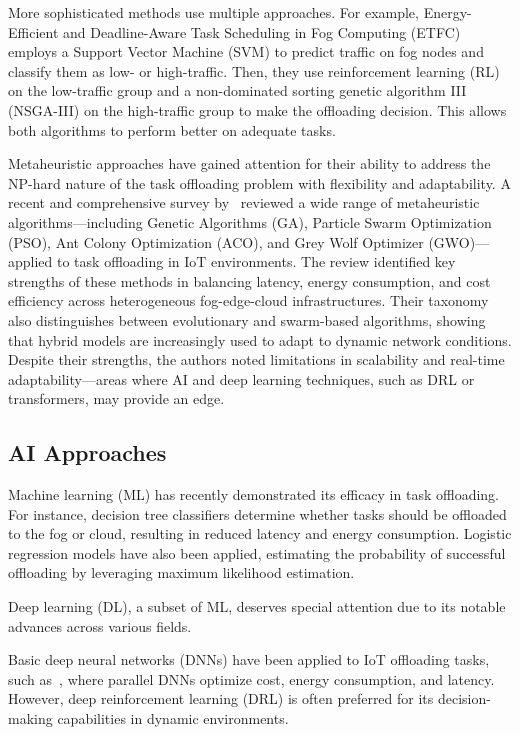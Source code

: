 \documentclass[preprint,3p,authoryear]{elsarticle}
\begin{document}
More sophisticated methods use multiple approaches. For example, Energy-Efficient and Deadline-Aware Task Scheduling in Fog Computing (ETFC)~\cite{pakmehr_etfc_2024} employs a Support Vector Machine (SVM) to predict traffic on fog nodes and classify them as low- or high-traffic. Then, they use reinforcement learning (RL) on the low-traffic group and a non-dominated sorting genetic algorithm III (NSGA-III) on the high-traffic group to make the offloading decision. This allows both algorithms to perform better on adequate tasks.

Metaheuristic approaches have gained attention for their ability to address the NP-hard nature of the task offloading problem with flexibility and adaptability. A recent and comprehensive survey by~\cite{rahmani_optimizing_2025} reviewed a wide range of metaheuristic algorithms—including Genetic Algorithms (GA), Particle Swarm Optimization (PSO), Ant Colony Optimization (ACO), and Grey Wolf Optimizer (GWO)—applied to task offloading in IoT environments. The review identified key strengths of these methods in balancing latency, energy consumption, and cost efficiency across heterogeneous fog-edge-cloud infrastructures. Their taxonomy also distinguishes between evolutionary and swarm-based algorithms, showing that hybrid models are increasingly used to adapt to dynamic network conditions. Despite their strengths, the authors noted limitations in scalability and real-time adaptability—areas where AI and deep learning techniques, such as DRL or transformers, may provide an edge.


\subsection{AI Approaches}

Machine learning (ML) has recently demonstrated its efficacy in task offloading. For instance, decision tree classifiers\cite{suryadevara_energy_2021} determine whether tasks should be offloaded to the fog or cloud, resulting in reduced latency and energy consumption. Logistic regression models\cite{bukhari_intelligent_2022} have also been applied, estimating the probability of successful offloading by leveraging maximum likelihood estimation.

Deep learning (DL), a subset of ML, deserves special attention due to its notable advances across various fields. 

Basic deep neural networks (DNNs) have been applied to IoT offloading tasks, such as~\citet{sarkar_deep_2022}, where parallel DNNs optimize cost, energy consumption, and latency. However, deep reinforcement learning (DRL) is often preferred for its decision-making capabilities in dynamic environments.
\end{document}
